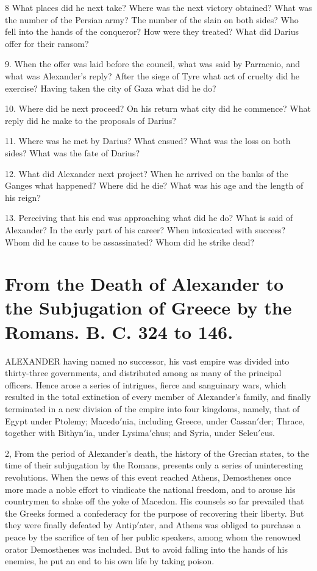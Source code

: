 \documentclass[openany,a4paper]{memoir}
\begin{document}
8 What places did 
he next take? Where was the next victory obtained? What was the 
number of the Persian army? The number of the slain on both sides? 
Who fell into the hands of the conqueror? How were they treated? 
What did Darius offer for their ransom?

9. When the offer was laid 
before the council, what was said by Parraenio, and what was Alexander's reply? After the siege of Tyre what act of cruelty did he exercise? Having taken the city of Gaza what did he do? 

10. Where did 
he next proceed? On his return what city did he commence? What 
reply did he make to the proposals of Darius?

11. Where was he met 
by Darius? 
What ensued? What was the loss on both sides? What was the fate 
of Darius? 

12. What did Alexander next project? When he arrived 
on the banks of the Ganges what happened? Where did he die? 
What was his age and the length of his reign?

13. Perceiving that 
his end was approaching what did he do? What is said of Alexander? In the early part of his career? When intoxicated with success? 
Whom did he cause to be assassinated? Whom did he strike dead? 


\chapter{From the Death of Alexander to the Subjugation 
of Greece by the Romans. B. C. 324 to 146.} 

ALEXANDER having named no successor, his vast empire was divided into thirty-three governments, and distributed among as many of the principal officers. Hence arose 
a series of intrigues, fierce and sanguinary wars, which resulted in the total extinction of every member of Alexander's 
family, and finally terminated in a new division of the empire 
into four kingdoms, namely, that of Egypt under Ptolemy; 
Macedo$'$nia, including Greece, under Cassan$'$der; Thrace, 
together with Bithyn$'$ia, under Lysima$'$chus; and Syria, 
under Seleu$'$cus. 

2, From the period of Alexander's death, the history of 
the Grecian states, to the time of their subjugation by the 
Romans, presents only a series of uninteresting revolutions. 
When the news of this event reached Athens, Demosthenes 
once more made a noble effort to vindicate the national freedom, and to arouse his countrymen to shake off the yoke of 
Macedon. His counsels so far prevailed that the Greeks 
formed a confederacy for the purpose of recovering their 
liberty. But they were finally defeated by Antip$'$ater, and 
Athens was obliged to purchase a peace by the sacrifice of 
ten of her public speakers, among whom the renowned orator 
Demosthenes was included. But to avoid falling into the 
hands of his enemies, he put an end to his own life by taking 
poison. 
\end{document}
